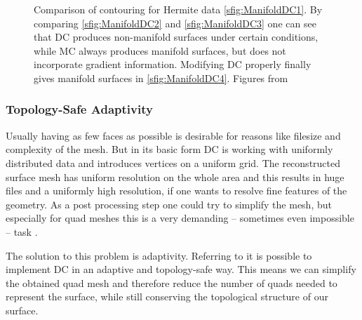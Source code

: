 \begin{figure}
\begin{center}
\begin{subfigure}[t]{.2\textwidth}
\begin{center}
\label{sfig:ManifoldDC4}
\end{center}
\end{subfigure}
\caption{Comparison of contouring for Hermite data \autoref{sfig:ManifoldDC1}. By comparing \autoref{sfig:ManifoldDC2} and \autoref{sfig:ManifoldDC3} one can see that \ac{DC} produces non-manifold surfaces under certain conditions, while \ac{MC} always produces manifold surfaces, but does not incorporate gradient information. Modifying \ac{DC} properly finally gives manifold surfaces in \autoref{sfig:ManifoldDC4}. Figures from \cite{Schaefer2007}}
\label{fig:manifold}
\end{center}
\end{figure}

\subsubsection{Topology-Safe Adaptivity}
Usually having as few faces as possible is desirable for reasons like filesize and complexity of the mesh. But in its basic form \ac{DC} is working with uniformly distributed data and introduces vertices on a uniform grid. The reconstructed surface mesh has uniform resolution on the whole area and this results in huge files and a uniformly high resolution, if one wants to resolve fine features of the geometry. As a post processing step one could try to simplify the mesh, but especially for \ac{quad} meshes this is a very demanding -- sometimes even impossible -- task \cite{Puppo2010}.

The solution to this problem is adaptivity. Referring to \cite{Hermite2002} it is possible to implement \ac{DC} in an adaptive and topology-safe way. This means we can simplify the obtained \ac{quad} mesh and therefore reduce the number of \acp{quad} needed to represent the surface, while still conserving the topological structure of our surface.
